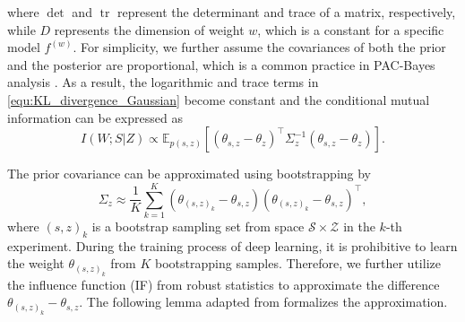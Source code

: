 \documentclass[lettersize,journal]{IEEEtran}
\newcommand{\E}{\mathbb{E}}
\theoremstyle{definition}
\theoremstyle{plain}
\begin{document}
where $\det$ and $\operatorname{tr}$ represent the determinant and trace of a matrix, respectively, while $D$ represents the dimension of weight $w$, which is a constant for a specific model $f^{(w)}$. For simplicity, we further assume the covariances of both the prior and the posterior are proportional, which is a common practice in PAC-Bayes analysis \cite{proportional-covariance}. As a result, the logarithmic and trace terms in \cref{equ:KL_divergence_Gaussian} become constant and the conditional mutual information can be expressed as
\begin{equation}
    \label{equ:conditional_MI}
    I(W ; S | Z) \propto \E_{p(s,z)}\left[\left(\theta_{s,z}-\theta_z\right)^{\top} \Sigma_z^{-1}\left(\theta_{s,z}-\theta_z\right)\right].
\end{equation}

The prior covariance can be approximated using bootstrapping \cite{PAC-Bayes} by
\begin{equation}
    \label{equ:bootstrapping}
    \Sigma_z \approx \frac{1}{K} \sum_{k=1}^K\left(\theta_{(s,z)_k}-\theta_{s,z}\right)\left(\theta_{(s,z)_k}-\theta_{s,z}\right)^{\top},
\end{equation}
where $(s,z)_k$ is a bootstrap sampling set from space $\mathcal{S}\times\mathcal{Z}$ in the $k$-th experiment. During the training process of deep learning, it is prohibitive to learn the weight $\theta_{(s,z)_k}$ from $K$ bootstrapping samples. Therefore, we further utilize the influence function (IF) from robust statistics \cite{influence-function} to approximate the difference $\theta_{(s,z)_k}-\theta_{s,z}$. The following lemma adapted from \cite{IF} formalizes the approximation.
\end{document}
